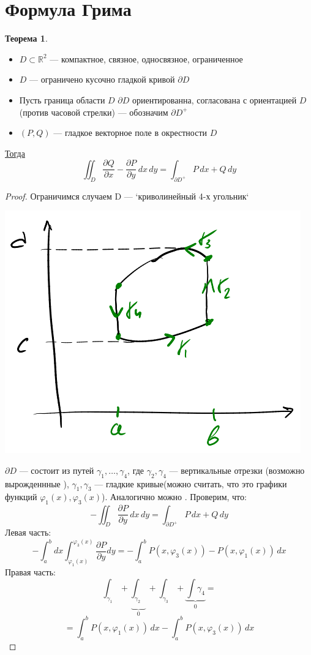 \documentclass[oneside]{book}
\newcommand{\R}{\mathbb{R}}
\newcommand{\fixme}{{\color{red}\fbox{\text{Исправить}}}}
\theoremstyle{plain}
\theoremstyle{remark}
\theoremstyle{definition}
\newtheorem{theorem}{Теорема}[section]
\begin{document}
\section{Формула Грима}
\label{sec:org5902b24}
\begin{theorem}
\-
\begin{itemize}
\item \(D \subset \R^2\) --- компактное, связное, односвязное, ограниченное
\item \(D\) --- ограничено кусочно гладкой кривой \(\partial D\)
\item Пусть граница области \(D\) \(\partial D\) ориентированна, согласована с ориентацией \(D\) (против часовой стрелки) --- обозначим \(\partial D^+\)
\item \((P, Q)\) --- гладкое векторное поле в окрестности \(D\)
\end{itemize}
\uline{Тогда} \[ \iint_D \frac{\partial Q}{\partial x} - \frac{\partial P}{\partial y}\,dx\,dy = \int_{\partial D^+} P\,dx + Q\,dy \]
\end{theorem}
\begin{proof}
Ограничимся случаем D --- `криволинейный 4-х угольник`
\begin{center}
\includegraphics[scale=0.4]{9_1.png}
\end{center}
\(\partial D\) --- состоит из путей \(\gamma_1, \dots, \gamma_4\), где \(\gamma_2, \gamma_4\) --- вертикальные отрезки (возможно вырожденнные ), \(\gamma_1, \gamma_3\) --- гладкие кривые(можно считать, что это графики функций \(\varphi_1(x), \varphi_3(x)\)). Аналогично можно \fixme.
Проверим, что:
\[ - \iint_D \frac{\partial P}{\partial y}\,dx\,dy = \int_{\partial D^+} P\,dx + Q\,dy \]
Левая часть:
\[ - \int_a^b dx \int_{\varphi_1(x)}^{\varphi_3(x)} \frac{\partial P}{\partial y} dy = - \int_a^b P(x, \varphi_3(x)) - P(x, \varphi_1(x)) \,dx \]
Правая часть:
\[ \int_{\gamma_1} + \underbrace{\int_{\gamma_2}}_0 + \int_{\gamma_3} + \underbrace{\int{\gamma_4}}_0 =  \]
\[ = \int_a^b P(x, \varphi_1(x))\,dx - \int_a^b P(x, \varphi_3(x))\, dx \]
\end{proof}
\end{document}

